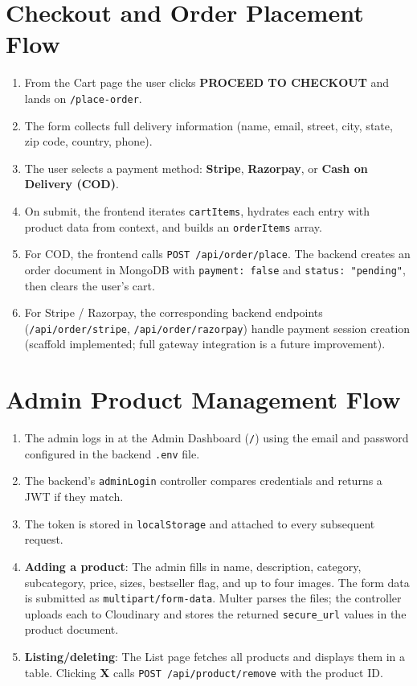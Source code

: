 \documentclass[12pt,a4paper]{report}
\begin{document}
\section{Checkout and Order Placement Flow}

\begin{enumerate}[leftmargin=*, label=\arabic*.]
  \item From the Cart page the user clicks \textbf{PROCEED TO CHECKOUT} and lands on
        \texttt{/place-order}.
  \item The form collects full delivery information (name, email, street, city, state,
        zip code, country, phone).
  \item The user selects a payment method: \textbf{Stripe}, \textbf{Razorpay}, or
        \textbf{Cash on Delivery (COD)}.
  \item On submit, the frontend iterates \texttt{cartItems}, hydrates each entry with product
        data from context, and builds an \texttt{orderItems} array.
  \item For COD, the frontend calls \texttt{POST /api/order/place}.
        The backend creates an order document in MongoDB with \texttt{payment: false} and
        \texttt{status: "pending"}, then clears the user's cart.
  \item For Stripe / Razorpay, the corresponding backend endpoints
        (\texttt{/api/order/stripe}, \texttt{/api/order/razorpay}) handle payment session
        creation (scaffold implemented; full gateway integration is a future improvement).
\end{enumerate}

\section{Admin Product Management Flow}

\begin{enumerate}[leftmargin=*, label=\arabic*.]
  \item The admin logs in at the Admin Dashboard (\texttt{/}) using the email and password
        configured in the backend \texttt{.env} file.
  \item The backend's \texttt{adminLogin} controller compares credentials and returns a JWT
        if they match.
  \item The token is stored in \texttt{localStorage} and attached to every subsequent request.
  \item \textbf{Adding a product}: The admin fills in name, description, category, subcategory,
        price, sizes, bestseller flag, and up to four images.
        The form data is submitted as \texttt{multipart/form-data}.
        Multer parses the files; the controller uploads each to Cloudinary and stores the
        returned \texttt{secure\_url} values in the product document.
  \item \textbf{Listing/deleting}: The List page fetches all products and displays them in a table.
        Clicking \textbf{X} calls \texttt{POST /api/product/remove} with the product ID.
\end{enumerate}
\end{document}
